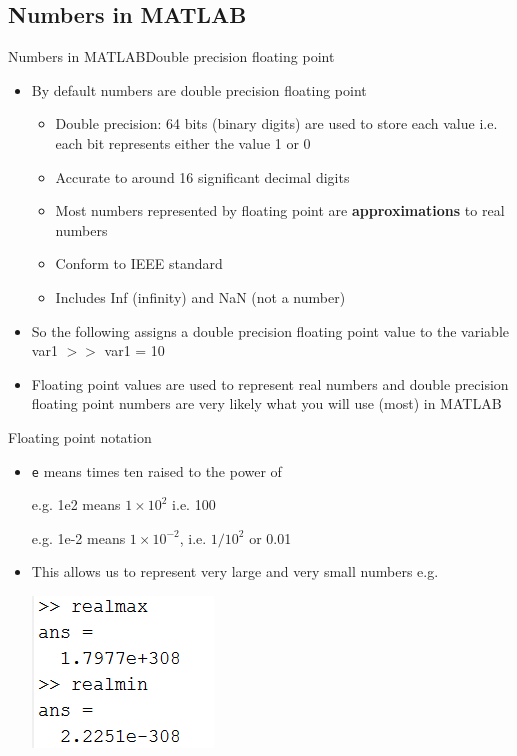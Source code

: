 \documentclass{beamer}
\begin{document}
\subsection{Numbers in MATLAB}
\begin{frame}{Numbers in MATLAB}{Double precision floating point}
	\begin{itemize}
		\item By default numbers are double precision floating point
		\begin{itemize}
			\item Double precision: 64 bits (binary digits) are used to store each value i.e. each bit represents either the value 1 or 0
			\item Accurate to around 16 significant decimal digits
			\item Most numbers represented by floating point are \textbf{approximations} to real numbers
			\item Conform to IEEE standard
			\item Includes Inf (infinity) and NaN (not a number)
		\end{itemize}
		\item So the following assigns a double precision floating point value to the variable var1
		$>>$ var1 = 10
		\item Floating point values are used to represent real numbers and double precision floating point numbers are very likely what you will use (most) in MATLAB
	\end{itemize}
\end{frame}

\begin{frame}{Floating point notation}
	\begin{itemize}
		\item \texttt{e} means times ten raised to the power of 
		
		e.g. 1e2 means $1 \times 10^{2}$ i.e. 100
		
		e.g. 1e-2 means $1 \times 10^{-2}$, i.e. $1/10^{2}$ or 0.01
		\item This allows us to represent very large and very small numbers e.g.
		
		\includegraphics[scale=0.7]{realmax_realmin}
	\end{itemize} 
\end{frame}
\end{document}
